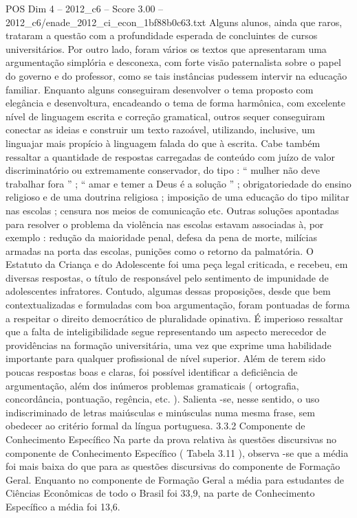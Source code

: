 \begin{textsample}{POS Dim 4 – 2012\_c6 – Score 3.00 – 2012\_c6/enade\_2012\_ci\_econ\_1bf88b0c63.txt}
Alguns alunos, ainda que raros, trataram a questão com a profundidade esperada de concluintes de cursos universitários.
Por outro lado, foram vários os textos que apresentaram uma argumentação simplória e desconexa, com forte visão paternalista sobre o papel do governo e do professor, como se tais instâncias pudessem intervir na educação familiar.
Enquanto alguns conseguiram desenvolver o tema proposto com elegância e desenvoltura, encadeando o tema de forma harmônica, com excelente nível de linguagem escrita e correção gramatical, outros sequer conseguiram conectar as ideias e construir um texto razoável, utilizando, inclusive, um linguajar mais propício à linguagem falada do que à escrita.
Cabe também ressaltar a quantidade de respostas carregadas de conteúdo com juízo de valor discriminatório ou extremamente conservador, do tipo : “ mulher não deve trabalhar fora ” ; “ amar e temer a Deus é a solução ” ; obrigatoriedade do ensino religioso e de uma doutrina religiosa ; imposição de uma educação do tipo militar nas escolas ; censura nos meios de comunicação etc.
Outras soluções apontadas para resolver o problema da violência nas escolas estavam associadas à, por exemplo : redução da maioridade penal, defesa da pena de morte, milícias armadas na porta das escolas, punições como o retorno da palmatória.
O Estatuto da Criança e do Adolescente foi uma peça legal criticada, e recebeu, em diversas respostas, o título de responsável pelo sentimento de impunidade de adolescentes infratores.
Contudo, algumas dessas proposições, desde que bem contextualizadas e formuladas com boa argumentação, foram pontuadas de forma a respeitar o direito democrático de pluralidade opinativa.
É imperioso ressaltar que a falta de inteligibilidade segue representando um aspecto merecedor de providências na formação universitária, uma vez que exprime uma habilidade importante para qualquer profissional de nível superior.
Além de terem sido poucas respostas boas e claras, foi possível identificar a deficiência de argumentação, além dos inúmeros problemas gramaticais ( ortografia, concordância, pontuação, regência, etc. ).
Salienta -se, nesse sentido, o uso indiscriminado de letras maiúsculas e minúsculas numa mesma frase, sem obedecer ao critério formal da língua portuguesa. 3.3.2 Componente de Conhecimento Específico Na parte da prova relativa às questões discursivas no componente de Conhecimento Específico ( Tabela 3.11 ), observa -se que a média foi mais baixa do que para as questões discursivas do componente de Formação Geral.
Enquanto no componente de Formação Geral a média para estudantes de Ciências Econômicas de todo o Brasil foi 33,9, na parte de Conhecimento Específico a média foi 13,6.

\end{textsample}
